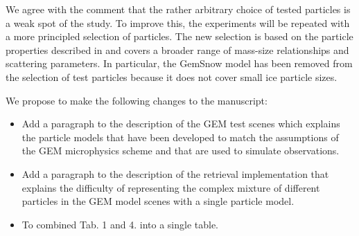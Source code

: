 \documentclass[11pt]{scrartcl}
\begin{document}
We agree with the comment that the rather arbitrary choice of tested particles
is a weak spot of the study. To improve this, the experiments will be repeated
with a more principled selection of particles. The new selection is based on the
particle properties described in \citet{ekelund19} and covers a broader range of
mass-size relationships and scattering parameters. In particular, the GemSnow
model has been removed from the selection of test particles because it does not
cover small ice particle sizes.

We propose to make the following changes to the manuscript:

\begin{itemize}
\item Add a paragraph to the description of the GEM test scenes which explains
  the particle models that have been developed to match the assumptions of
  the GEM microphysics scheme and that are used to simulate observations.
\item Add a paragraph to the description of the retrieval implementation that
  explains the difficulty of representing the complex mixture of different
  particles in the GEM model scenes with a single particle model.
\item To combined Tab. 1 and 4. into a single table.
\end{itemize}
\end{document}
